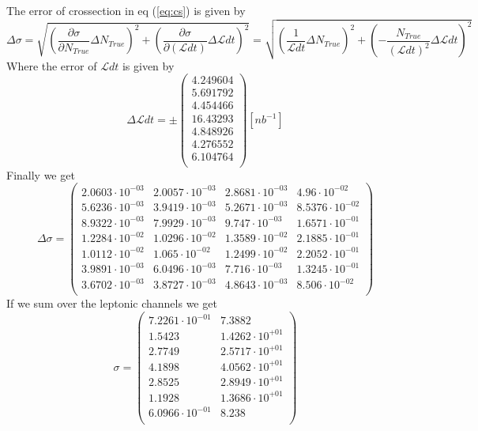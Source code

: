 \documentclass[]{article}
\begin{document}
The error of crossection in eq (\ref{eq:cs}) is given by
\begin{equation}
\Delta\sigma = \sqrt{\left(\frac{\partial\sigma}{\partial N_{True}}\Delta N_{True}\right)^2+
\left(\frac{\partial\sigma}{\partial (\mathcal{L}dt)}\Delta{\mathcal{L}dt}\right)^2} = \sqrt{\left(\frac{1}{\mathcal{L}dt}\Delta N_{True}\right)^2
+\left(-\frac{N_{True}}{(\mathcal{L}dt)^2}\Delta\mathcal{L}dt\right)^2}
\end{equation}
Where the error of $\mathcal{L}dt$ is given by
\begin{equation}
\Delta\mathcal{L}dt = \pm \begin{pmatrix}
   4.249604 \\
   5.691792 \\
   4.454466 \\
   16.43293 \\
   4.848926 \\
   4.276552 \\
   6.104764 \\
\end{pmatrix} [nb^{-1}]
\end{equation}
Finally we get
\begin{equation}
\Delta\sigma=\begin{pmatrix}
   2.0603\cdot 10^{-03} & 2.0057\cdot 10^{-03} & 2.8681\cdot 10^{-03} & 4.96\cdot 10^{-02} \\
   5.6236\cdot 10^{-03} & 3.9419\cdot 10^{-03} & 5.2671\cdot 10^{-03} & 8.5376\cdot 10^{-02} \\
   8.9322\cdot 10^{-03} & 7.9929\cdot 10^{-03} & 9.747\cdot 10^{-03} & 1.6571\cdot 10^{-01} \\
   1.2284\cdot 10^{-02} & 1.0296\cdot 10^{-02} & 1.3589\cdot 10^{-02} & 2.1885\cdot 10^{-01} \\
   1.0112\cdot 10^{-02} & 1.065\cdot 10^{-02} & 1.2499\cdot 10^{-02} & 2.2052\cdot 10^{-01} \\
   3.9891\cdot 10^{-03} & 6.0496\cdot 10^{-03} & 7.716\cdot 10^{-03} & 1.3245\cdot 10^{-01} \\
   3.6702\cdot 10^{-03} & 3.8727\cdot 10^{-03} & 4.8643\cdot 10^{-03} & 8.506\cdot 10^{-02} \\
\end{pmatrix}
\end{equation}
If we sum over the leptonic channels we get
\begin{equation}
\sigma=
\begin{pmatrix}
   7.2261\cdot 10^{-01} & 7.3882 \\
   1.5423 & 1.4262\cdot 10^{+01} \\
   2.7749 & 2.5717\cdot 10^{+01} \\
   4.1898 & 4.0562\cdot 10^{+01} \\
   2.8525 & 2.8949\cdot 10^{+01} \\
   1.1928 & 1.3686\cdot 10^{+01} \\
   6.0966\cdot 10^{-01} & 8.238 \\
\end{pmatrix}
\end{equation}
\end{document}
